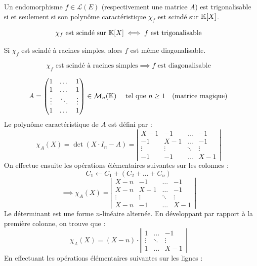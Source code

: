 \documentclass[12pt, a4paper]{report}
\begin{document}
\begin{theorem}
    Un endomorphisme $f \in \mathcal{L}(E)$ (respectivement une matrice $A$) est trigonalisable si et seulement si son polynôme caractéristique $\chi_f$ est scindé sur $\mathbb{K}[X]$.

    $$\chi_f \text{ est scindé sur } \mathbb{K}[X] \iff f \text{ est trigonalisable}$$

    Si $\chi_f$ est scindé à racines simples, alors $f$ est même diagonalisable.

    $$\chi_f \text{ est scindé à racines simples} \implies f \text{ est diagonalisable}$$
\end{theorem}

\begin{example}
    $$A = \left(\begin{matrix} 1 & \dots & 1 \\ 1 & \dots & 1 \\ \vdots & \ddots & \vdots \\ 1 & \dots & 1 \end{matrix}\right) \in \mathcal{M}_n(\mathbb{K}) \quad \text{ tel que } n \ge 1 \quad \text{(matrice magique)}$$
    Le polynôme caractéristique de $A$ est défini par :
    $$\chi_A(X) = \det(X \cdot I_n - A) = \left|\begin{matrix} X-1 & -1 & \dots & -1 \\ -1 & X-1 & \dots & -1 \\ \vdots & \vdots & \ddots & \vdots \\ -1 & -1 & \dots & X-1 \end{matrix}\right|$$
    On effectue ensuite les opérations élémentaires suivantes sur les colonnes :
    $$C_1 \leftarrow C_1 + (C_2 + \dots + C_n)$$
    $$\implies \chi_A(X) = \left|\begin{matrix} X - n & -1 & \dots & -1 \\ X-n & X-1 & \dots & -1 \\ \vdots & \vdots & \ddots & \vdots \\ X-n & -1 & \dots & X-1 \end{matrix}\right|$$
    Le déterminant est une forme $n$-linéaire alternée. En développant par rapport à la première colonne, on trouve que :
    $$\chi_A(X) = (X-n) \cdot \left|\begin{matrix} 1 & \dots & -1 \\ \vdots & \ddots & \vdots \\ 1 & \dots & X-1 \end{matrix}\right|$$
        En effectuant les opérations élémentaires suivantes sur les lignes :

\end{example}
\end{document}
